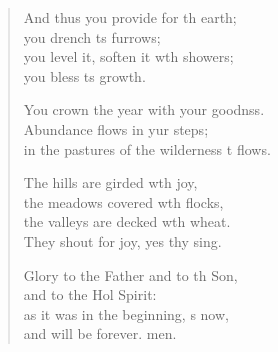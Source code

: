 \begin{verse}
\begin{patverse}
And thus you provide for th earth;\Med\\
you drench \pointup{\i}ts furrows;\\
you level it, soften it w\pointup{\i}th showers;\Med\\
you bless \pointup{\i}ts growth.

You crown the year with your goodnss.\Flex\\
Abundance flows in yur steps;\Med\\
in the pastures of the wilderness \pointup{\i}t flows.

The hills are girded w\pointup{\i}th joy,\Med\\
the meadows covered w\pointup{\i}th flocks,\\
the valleys are decked w\pointup{\i}th wheat.\Med\\
They shout for joy, yes thy sing.

Glory to the Father and to th Son,\Med\\
and to the Hol Spirit:\\
as it was in the beginning, \pointup{\i}s now,\Med\\
and will be forever. men. 
  \end{patverse}
\end{verse}
